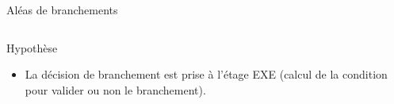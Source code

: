 %
\begin{Frame}{Aléas de branchements}

  \begin{columns}[t]
    \begin{column}{.2\textwidth}
      \begin{block}{Hypothèse}
        \begin{center}
          \begin{itemize}
          \item La décision de branchement est prise à l'étage EXE (calcul
            de la condition pour valider ou non le branchement).
          \end{itemize}
        \end{center}
      \end{block}
    \end{column}
    \vspace{-0.3cm}
    \begin{column}{.9\textwidth}
    \begin{center}
    \end{center}

    \end{column}
  \end{columns}


\end{Frame}


